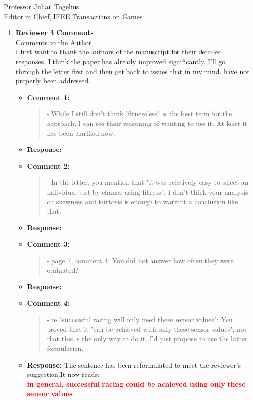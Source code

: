 \documentclass[10pt]{letter} %
\begin{document}
\begin{letter}{Professor Julian Togelius \\ Editor in Chief, IEEE Transactions on Games}
\begin{enumerate}
%
\item {\bf \underline{ Reviewer 3 Comments}}\\
		Comments to the Author\\
		I first want to thank the authors of the manuscript for their detailed responses. I think the paper has already improved significantly. I'll go through the letter first and then get back to issues that in my mind, have not properly been addressed.	
		\begin{itemize}
			\item {\bf Comment 1:}
				\begin{quote}	
					- While I still don't think "fitnessless" is the best term for the approach, I can see their reasoning of wanting to use it. At least it has been clarified now.
				\end{quote}	
			\item {\bf Response:} 
			\item {\bf Comment 2:}
				\begin{quote}	
					- In the letter, you mention that "it was relatively easy to select an individual just by chance using fitness". I don't think your analysis on skewness and kurtosis is enough to warrant a conclusion like that.
				\end{quote}	
			\item {\bf Response:} 
			\item {\bf Comment 3:}
				\begin{quote}	
					- page 7, comment 4: You did not answer how often they were evaluated?
				\end{quote}	
			\item {\bf Response:} 
			\item {\bf Comment 4:}
				\begin{quote}	
					- re "successful racing will only need these sensor values": You proved that it "can be achieved with only these sensor values", not that this is the only way to do it. I'd just propose to use the latter formulation.
				\end{quote}	
			\item{\bf Response:} 
				The sentence has been reformulated to meet the reviewer's suggestion.It now reads:\\
			 \textcolor{red}{	{\bf in general, successful racing could be achieved using only these sensor values} }

\end{itemize}
\end{enumerate}
\end{letter}
\end{document}
